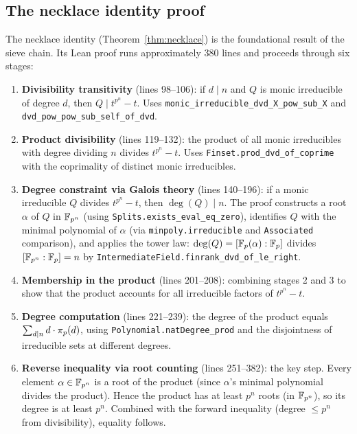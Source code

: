 \subsection{The necklace identity proof}

The necklace identity (Theorem~\ref{thm:necklace}) is the foundational
result of the sieve chain. Its Lean proof runs approximately 380 lines
and proceeds through six stages:

\begin{enumerate}
  \item \textbf{Divisibility transitivity} (lines 98--106): if $d \mid n$
    and $Q$ is monic irreducible of degree $d$, then $Q \mid t^{p^n} - t$.
    Uses \texttt{monic\_irreducible\_dvd\_X\_pow\_sub\_X} and
    \texttt{dvd\_pow\_pow\_sub\_self\_of\_dvd}.

  \item \textbf{Product divisibility} (lines 119--132): the product of all
    monic irreducibles with degree dividing $n$ divides $t^{p^n} - t$.
    Uses \texttt{Finset.prod\_dvd\_of\_coprime} with the coprimality of
    distinct monic irreducibles.

  \item \textbf{Degree constraint via Galois theory} (lines 140--196): if
    a monic irreducible $Q$ divides $t^{p^n} - t$, then $\deg(Q) \mid n$.
    The proof constructs a root $\alpha$ of $Q$ in $\mathbb{F}_{p^{n}}$ (using
    \texttt{Splits.exists\_eval\_eq\_zero}), identifies $Q$ with the minimal
    polynomial of $\alpha$ (via \texttt{minpoly.irreducible} and
    \texttt{Associated} comparison), and applies the tower law:
    $\deg(Q) = [\mathbb{F}_p(\alpha):\mathbb{F}_p]$ divides $[\mathbb{F}_{p^{n}}:\mathbb{F}_p] = n$ by
    \texttt{IntermediateField.finrank\_dvd\_of\_le\_right}.

  \item \textbf{Membership in the product} (lines 201--208): combining
    stages 2 and 3 to show that the product accounts for all irreducible
    factors of $t^{p^n} - t$.

  \item \textbf{Degree computation} (lines 221--239): the degree of the
    product equals $\sum_{d \mid n} d \cdot \pi_p(d)$, using
    \texttt{Polynomial.natDegree\_prod} and the disjointness of
    irreducible sets at different degrees.

  \item \textbf{Reverse inequality via root counting} (lines 251--382): the
    key step. Every element $\alpha \in \mathbb{F}_{p^{n}}$ is a root of the product
    (since $\alpha$'s minimal polynomial divides the product). Hence the
    product has at least $p^n$ roots (in $\mathbb{F}_{p^{n}}$), so its degree is at
    least $p^n$. Combined with the forward inequality (degree $\leq p^n$
    from divisibility), equality follows.
\end{enumerate}

